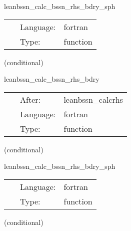 \hspace{5mm} leanbssn\_calc\_bssn\_rhs\_bdry\_sph 

\hspace{5mm}{\it mol boundary rhs calculation in spherical coordinates } 


\hspace{5mm}

 \begin{tabular*}{160mm}{cll} 
~ & Language:  & fortran \\ 
~ & Type:  & function \\ 
\end{tabular*} 


\vspace{5mm}

   (conditional) 

\hspace{5mm} leanbssn\_calc\_bssn\_rhs\_bdry 

\hspace{5mm}{\it mol boundary rhs calculation } 


\hspace{5mm}

 \begin{tabular*}{160mm}{cll} 
~ & After:  & leanbssn\_calcrhs \\ 
~ & Language:  & fortran \\ 
~ & Type:  & function \\ 
\end{tabular*} 


\vspace{5mm}

   (conditional) 

\hspace{5mm} leanbssn\_calc\_bssn\_rhs\_bdry\_sph 

\hspace{5mm}{\it mol boundary rhs calculation in spherical coordinates } 


\hspace{5mm}

 \begin{tabular*}{160mm}{cll} 
~ & Language:  & fortran \\ 
~ & Type:  & function \\ 
\end{tabular*} 


\vspace{5mm}

   (conditional) 

